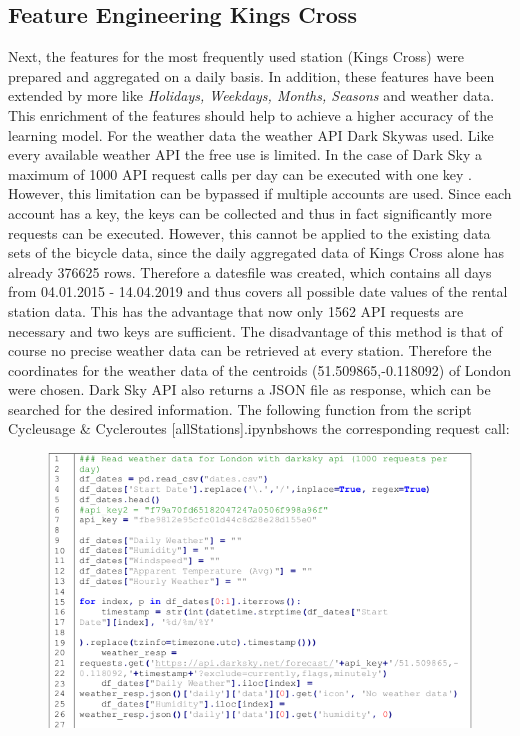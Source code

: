 \subsection{Feature Engineering Kings Cross}\label{king}
Next, the features for the most frequently used station (Kings Cross) were prepared and
aggregated on a daily basis. In addition, these features have been extended by more like
\emph{Holidays, Weekdays, Months, Seasons} and weather data. This enrichment of the features
should help to achieve a higher accuracy of the learning model. For the weather data the weather
API \glqq Dark Sky\grqq was used. Like every available weather API the free use is limited. In the case of
Dark Sky a maximum of 1000 API request calls per day can be executed with one key \cite{RN7}.
However, this limitation can be bypassed if multiple accounts are used. Since each account has
a key, the keys can be collected and thus in fact significantly more requests can be executed.
However, this cannot be applied to the existing data sets of the bicycle data, since the daily
aggregated data of Kings Cross alone has already 376625 rows. Therefore a \glqq dates\grqq file was
created, which contains all days from 04.01.2015 - 14.04.2019 and thus covers all possible date
values of the rental station data. This has the advantage that now only 1562 API requests are
necessary and two keys are sufficient. The disadvantage of this method is that of course no precise
weather data can be retrieved at every station. Therefore the coordinates for the weather data of
the centroids (51.509865,-0.118092) of London were chosen. Dark Sky API also returns a JSON
file as response, which can be searched for the desired information. The following function from
the script \glqq Cycleusage \& Cycleroutes [allStations].ipynb\grqq shows the corresponding request call:
\begin{figure}[H]
\hspace{-1.6cm}
\includegraphics[width=1.2\textwidth]{img/listing3}\label{fig:listing3}
\end{figure}
